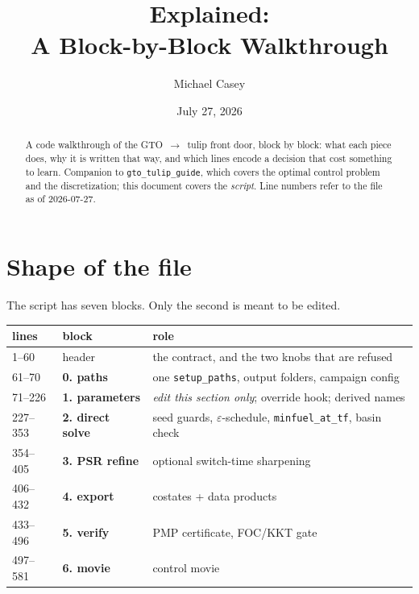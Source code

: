 \documentclass[11pt]{article}
\title{\file{run\_gto\_tulip.m} Explained:\\ A Block-by-Block Walkthrough}
\author{Michael Casey}
\date{July 27, 2026}
\newcommand{\file}[1]{\texttt{#1}}
\begin{document}
\maketitle

\begin{abstract}
A code walkthrough of the GTO~$\to$~tulip front door, block by block: what each
piece does, why it is written that way, and which lines encode a decision that
cost something to learn. Companion to \file{gto\_tulip\_guide}, which covers the
optimal control problem and the discretization; this document covers the
\emph{script}. Line numbers refer to the file as of 2026-07-27.
\end{abstract}

\tableofcontents

\section{Shape of the file}

The script has seven blocks. Only the second is meant to be edited.

\begin{center}
\begin{tabular}{llp{6.4cm}}
\toprule
lines & block & role \\
\midrule
1--60    & header      & the contract, and the two knobs that are refused \\
61--70   & \textbf{0. paths}   & one \file{setup\_paths}, output folders, campaign config \\
71--226  & \textbf{1. parameters} & \emph{edit this section only}; override hook; derived names \\
227--353 & \textbf{2. direct solve} & seed guards, $\varepsilon$-schedule, \file{minfuel\_at\_tf}, basin check \\
354--405 & \textbf{3. PSR refine}   & optional switch-time sharpening \\
406--432 & \textbf{4. export}       & costates + data products \\
433--496 & \textbf{5. verify}       & PMP certificate, FOC/KKT gate \\
497--581 & \textbf{6. movie}        & control movie \\
\bottomrule
\end{tabular}
\end{center}
\end{document}
